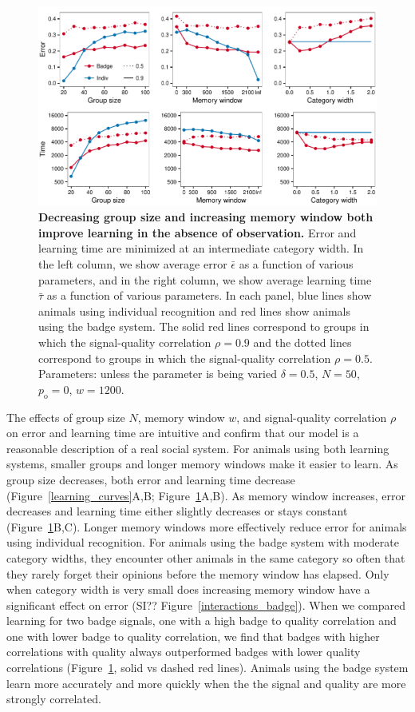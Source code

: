 \begin{figure}
\includegraphics[width=6.85in]{figures/parameters.pdf}
\caption{\sffamily\small\textbf{Decreasing group size and increasing memory window both improve learning in the absence of observation.} Error and learning time are minimized at an intermediate category width. In the left column, we show average error $\bar{\epsilon}$ as a function of various parameters, and in the right column, we show average learning time $\bar{\tau}$ as a function of various parameters. In each panel, blue lines show animals using individual recognition and red lines show animals using the badge system. The solid red lines correspond to groups in which the signal-quality correlation $\rho=0.9$ and the dotted lines correspond to groups in which the signal-quality correlation $\rho=0.5$. Parameters: unless the parameter is being varied $\delta = 0.5$, $N=50$, $p_\text{o}=0$, $w=1200$.}
\label{parameters}
\end{figure}


The effects of group size $N$, memory window $w$, and signal-quality correlation $\rho$ on error and learning time are intuitive and confirm that our model is a reasonable description of a real social system. For animals using both learning systems, smaller groups and longer memory windows make it easier to learn. As group size decreases, both error and learning time decrease (Figure~\ref{learning_curves}A,B; Figure~\ref{parameters}A,B). As memory window increases, error decreases and learning time either slightly decreases or stays constant (Figure~\ref{parameters}B,C). Longer memory windows more effectively reduce error for animals using individual recognition. For animals using the badge system with moderate category widths, they encounter other animals in the same category so often that they rarely forget their opinions before the memory window has elapsed. Only when category width is very small does increasing memory window have a significant effect on error (SI?? Figure~\ref{interactions_badge}). When we compared learning for two badge signals, one with a high badge to quality correlation and one with lower badge to quality correlation, we find that badges with higher correlations with quality always outperformed badges with lower quality correlations (Figure~\ref{parameters}, solid vs dashed red lines). Animals using the badge system learn more accurately and more quickly when the the signal and quality are more strongly correlated.

